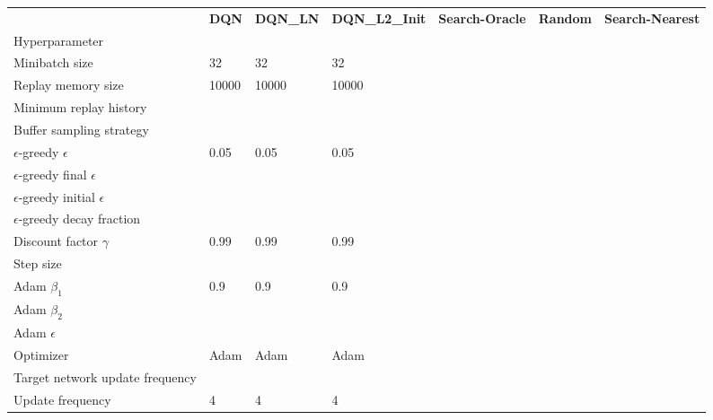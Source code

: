 \begin{tabular}{lllllll}
 & \bfseries DQN & \bfseries DQN_LN & \bfseries DQN_L2_Init & \bfseries Search-Oracle & \bfseries Random & \bfseries Search-Nearest \\
Hyperparameter &  &  &  &  &  &  \\
Minibatch size & 32 & 32 & 32 &  &  &  \\
Replay memory size & 10000 & 10000 & 10000 &  &  &  \\
Minimum replay history &  &  &  &  &  &  \\
Buffer sampling strategy &  &  &  &  &  &  \\
$\epsilon$-greedy $\epsilon$ & 0.05 & 0.05 & 0.05 &  &  &  \\
$\epsilon$-greedy final $\epsilon$ &  &  &  &  &  &  \\
$\epsilon$-greedy initial $\epsilon$ &  &  &  &  &  &  \\
$\epsilon$-greedy decay fraction &  &  &  &  &  &  \\
Discount factor $\gamma$ & 0.99 & 0.99 & 0.99 &  &  &  \\
Step size &  &  &  &  &  &  \\
Adam $\beta_1$ & 0.9 & 0.9 & 0.9 &  &  &  \\
Adam $\beta_2$ &  &  &  &  &  &  \\
Adam $\epsilon$ &  &  &  &  &  &  \\
Optimizer & Adam & Adam & Adam &  &  &  \\
Target network update frequency &  &  &  &  &  &  \\
Update frequency & 4 & 4 & 4 &  &  &  \\
\end{tabular}
